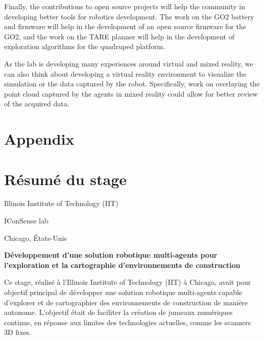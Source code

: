\documentclass[12pt]{article}
\begin{document}
    Finally, the contributions to open source projects will help the community in developing better tools for robotics development. The work on the GO2 battery and firmware will help in the development of an open source firmware for the GO2, and the work on the TARE planner will help in the development of exploration algorithms for the quadruped platform.

    As the lab is developing many experiences around virtual and mixed reality, we can also think about developing a virtual reality environment to visualize the simulation or the data captured by the robot. Specifically, work on overlaying the point cloud captured by the agents in mixed reality could allow for better review of the acquired data.

    

\newpage


\newpage
{}
\listoffigures


\newpage
\section*{Appendix}


\newpage
\thispagestyle{empty}
\section*{Résumé du stage}

\noindent
Illinois Institute of Technology (IIT)

\noindent
IConSense lab

\noindent
Chicago, États-Unis

\begin{center}
\textbf{Développement d'une solution robotique multi-agents pour l'exploration et la cartographie d'environnements de construction}
\end{center}

Ce stage, réalisé à l'Illinois Institute of Technology (IIT) à Chicago, avait pour objectif principal de développer une solution robotique multi-agents capable d'explorer et de cartographier des environnements de construction de manière autonome. L'objectif était de faciliter la création de jumeaux numériques continus, en réponse aux limites des technologies actuelles, comme les scanners 3D fixes.
\end{document}
